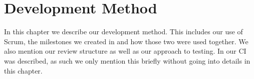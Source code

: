 \chapter{Development Method}\label{cha:development_method}
In this chapter we describe our development method.
This includes our use of Scrum, the milestones we created in  and how those two were used together.
We also mention our review structure as well as our approach to testing.
In  our \ac{CI} was described, as such we only mention this briefly without going into details in this chapter.





